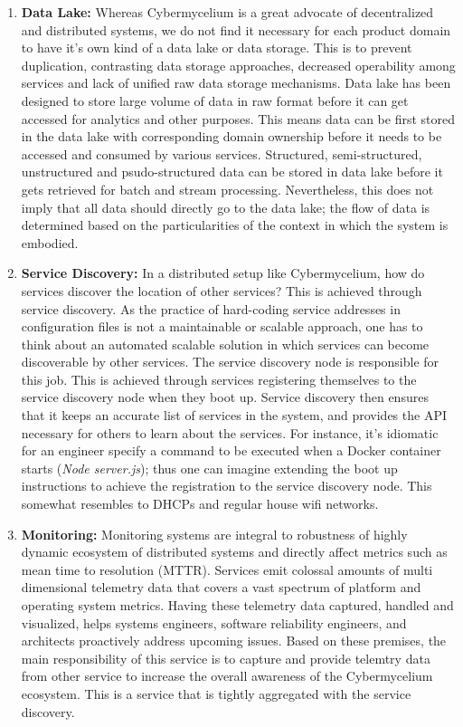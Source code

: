 \documentclass[review]{elsarticle}
\begin{document}
\begin{enumerate}
    \item \textbf{Data Lake:} Whereas Cybermycelium is a great advocate of decentralized and distributed systems, we do not find it necessary for each product domain to have it's own kind of a data lake or data storage. This is to prevent duplication, contrasting data storage approaches, decreased operability among services and lack of unified raw data storage mechanisms. Data lake has been designed to store large volume of data in raw format before it can get accessed for analytics and other purposes. This means data can be first stored in the data lake with corresponding domain ownership before it needs to be accessed and consumed by various services. Structured, semi-structured, unstructured and psudo-structured data can be stored in data lake before it gets retrieved for batch and stream processing. Nevertheless, this does not imply that all data should directly go to the data lake; the flow of data is determined based on the particularities of the context in which the system is embodied.
    \item \textbf{Service Discovery:} In a distributed setup like Cybermycelium, how do services discover the location of other services? This is achieved through service discovery. As the practice of hard-coding service addresses in configuration files is not a maintainable or scalable approach, one has to think about an automated scalable solution in which services can become discoverable by other services. The service discovery node is responsible for this job. This is achieved through services registering themselves to the service discovery node when they boot up. Service discovery then ensures that it keeps an accurate list of services in the system, and provides the API necessary for others to learn about the services. For instance, it's idiomatic for an engineer specify a command to be executed when a Docker container starts (\emph{Node server.js}); thus one can imagine extending the boot up instructions to achieve the registration to the service discovery node. This somewhat resembles to DHCPs and regular house wifi networks. 
    \item \textbf{Monitoring:} Monitoring systems are integral to robustness of highly dynamic ecosystem of distributed systems and directly affect metrics such as mean time to resolution (MTTR). Services emit colossal amounts of multi dimensional telemetry data that covers a vast spectrum of platform and operating system metrics. Having these telemetry data captured, handled and visualized, helps systems engineers, software reliability engineers, and architects proactively address upcoming issues. Based on these premises, the main responsibility of this service is to capture and provide telemtry data from other service to increase the overall awareness of the Cybermycelium ecosystem. This is a service that is tightly aggregated with the service discovery.
\end{enumerate}
\end{document}
